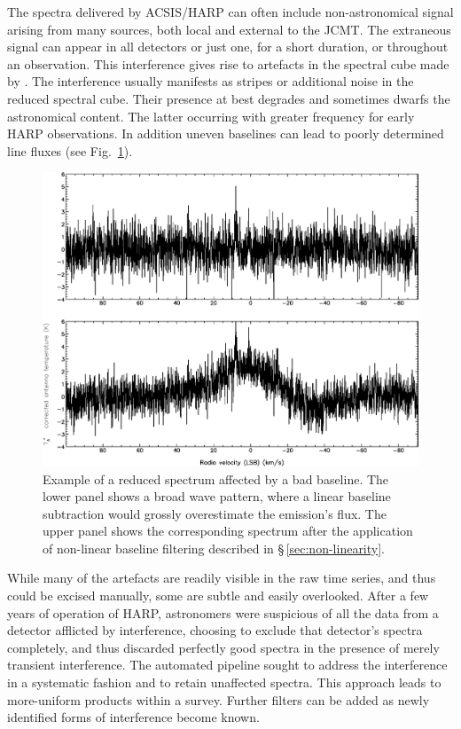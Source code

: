 \documentclass[final,authoryear,5p,times,twocolumn]{elsarticle}
\begin{document}
The spectra delivered by ACSIS/HARP can often include non-astronomical
signal arising from many sources, both local and external to the  JCMT. The
extraneous signal can appear in all detectors or just one, for a short
duration, or throughout an observation.  This interference gives rise
to artefacts in the spectral cube made by \makecube.  The interference
usually manifests as stripes or additional noise in the reduced
spectral cube.  Their presence at best degrades and sometimes dwarfs
the astronomical content.  The latter occurring with greater frequency
for early HARP observations.  In addition uneven baselines can lead
to poorly determined line fluxes (see Fig.~\ref{fig:badbase:spectrum}).

\begin{figure}[t]
\includegraphics[width=\columnwidth]{badbaseline_spectrum_example}
\caption{Example of a reduced spectrum affected by a bad baseline.
  The lower panel shows a broad wave pattern, where a linear baseline
  subtraction would grossly overestimate the emission's flux.  The upper
  panel shows the corresponding spectrum after the application of
  non-linear baseline filtering described in \S\,\ref{sec:non-linearity}.}
\label{fig:badbase:spectrum}
\end{figure}


While many of the artefacts are readily visible in the raw time
series, and thus could be excised manually, some are subtle and easily
overlooked.  After a few years of operation of HARP, astronomers were
suspicious of all the data from a detector afflicted by interference,
choosing to exclude that detector's spectra completely, and thus
discarded perfectly good spectra in the presence of merely transient
interference.  The automated pipeline sought to address the
interference in a systematic fashion and to retain unaffected spectra.
This approach leads to more-uniform products within a survey.  Further
filters can be added as newly identified forms of interference become
known.
\end{document}

